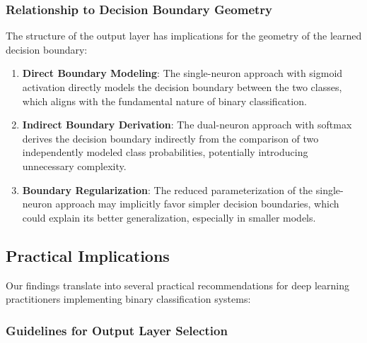 \subsubsection{Relationship to Decision Boundary Geometry}

The structure of the output layer has implications for the geometry of the learned decision boundary:

\begin{enumerate}
\item \textbf{Direct Boundary Modeling}: The single-neuron approach with sigmoid activation directly models the decision boundary between the two classes, which aligns with the fundamental nature of binary classification.

\item \textbf{Indirect Boundary Derivation}: The dual-neuron approach with softmax derives the decision boundary indirectly from the comparison of two independently modeled class probabilities, potentially introducing unnecessary complexity.

\item \textbf{Boundary Regularization}: The reduced parameterization of the single-neuron approach may implicitly favor simpler decision boundaries, which could explain its better generalization, especially in smaller models.
\end{enumerate}

\subsection{Practical Implications}

Our findings translate into several practical recommendations for deep learning practitioners implementing binary classification systems:

\subsubsection{Guidelines for Output Layer Selection}

